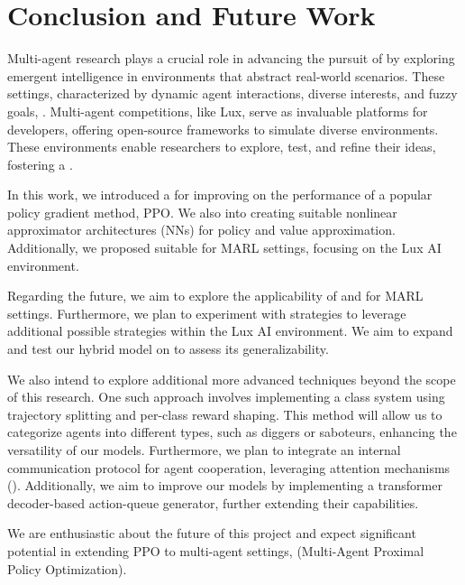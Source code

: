 \chapter{Conclusion and Future Work}
\label{ch:conc}

\noindent Multi-agent research plays a crucial role in advancing the pursuit of  by exploring emergent intelligence in environments that abstract real-world scenarios. These settings, characterized by dynamic agent interactions, diverse interests, and fuzzy goals, . Multi-agent competitions, like Lux, serve as invaluable platforms for developers, offering open-source frameworks to simulate diverse environments. These environments enable researchers to explore, test, and refine their ideas, fostering a .

\bigskip

\noindent In this work, we introduced a  for improving on the performance of a popular policy gradient method, PPO. We also  into creating suitable nonlinear approximator architectures (NNs) for policy and value approximation. Additionally, we proposed  suitable for MARL settings, focusing on the Lux AI environment.

\bigskip

\noindent Regarding the future, we aim to explore the applicability of  and  for MARL settings. Furthermore, we plan to experiment with  strategies to leverage additional possible strategies within the Lux AI environment. We aim to expand and test our hybrid model on  to assess its generalizability.

\bigskip

\noindent We also intend to explore additional more advanced techniques beyond the scope of this research. One such approach involves implementing a class system using trajectory splitting and per-class reward shaping. This method will allow us to categorize agents into different types, such as diggers or saboteurs, enhancing the versatility of our models. Furthermore, we plan to integrate an internal communication protocol for agent cooperation, leveraging attention mechanisms (\cite{vaswani2023attention}). Additionally, we aim to improve our models by implementing a transformer decoder-based action-queue generator, further extending their capabilities.

\bigskip

\noindent We are enthusiastic about the future of this project and expect significant potential in extending PPO to multi-agent settings,  (Multi-Agent Proximal Policy Optimization).
